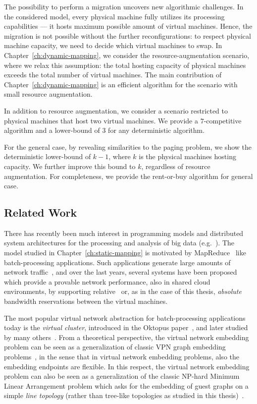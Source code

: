 The possibility to perform a migration uncovers new algorithmic challenges.
In the considered model, every physical machine fully utilizes its processing capabilities --- it hosts maximum possible amount of virtual machines.
Hence, the migration is not possible without the further reconfigurations: to respect physical machine capacity, we need to decide which virtual machines to swap.
In Chapter~\ref{ch:dynamic-mapping}, we consider the resource-augmentation scenario, where we relax this assumption: the total hosting capacity of physical machines exceeds the total number of virtual machines.
The main contribution of Chapter~\ref{ch:dynamic-mapping} is an efficient algorithm for the scenario with small resource augmentation.

In addition to resource augmentation, we consider a scenario restricted to physical machines that host two virtual machines.
We provide a $7$-competitive algorithm and a lower-bound of $3$ for any deterministic algorithm.

For the general case, by revealing similarities to the paging problem, we show the deterministic lower-bound of $k-1$, where $k$ is the physical machines hosting capacity.
We further improve this bound to $k$, regardless of resource augmentation.
For completeness, we provide the rent-or-buy algorithm for general case.

\subsection{Related Work}


There has recently been much interest in programming models and distributed
system architectures for the processing and analysis of big data (e.g.~\cite{nodb,mapreduce,shark}). The model studied in
Chapter~\ref{ch:static-mapping} is motivated by MapReduce~\cite{mapreduce} like batch-processing applications.
Such applications
generate large amounts of network traffic~\cite{orchestra,talk-about,amazonbw},
and over the last years, several systems have been proposed which provide
a provable network performance, also in shared cloud environments, by supporting
relative~\cite{faircloud,elasticswitch,seawall}
or, as in the case of this thesis, \emph{absolute}~\cite{oktopus,secondnet,drl,gatekeeper,proteus} bandwidth reservations
between the virtual machines.

The most popular virtual network abstraction for batch-processing applications today is the \emph{virtual cluster},
introduced in the Oktopus paper~\cite{oktopus}, and later studied by many others~\cite{talk-about,infocom16,ccr15emb,proteus}.
From a theoretical perspective, the virtual network embedding problem can be seen as a generalization
of classic VPN graph embedding problems~\cite{Goyal2008,gupta2001provisioning},
in the sense that in virtual network embedding problems, also the embedding endpoints are flexible. In this respect, the virtual network embedding problem can also be seen as a generalization of the
classic NP-hard Minimum Linear Arrangement problem which asks for the
embedding of guest graphs on a simple \emph{line topology} (rather than tree-like topologies as
studied in this thesis)~\cite{mla,mla-survey}.




